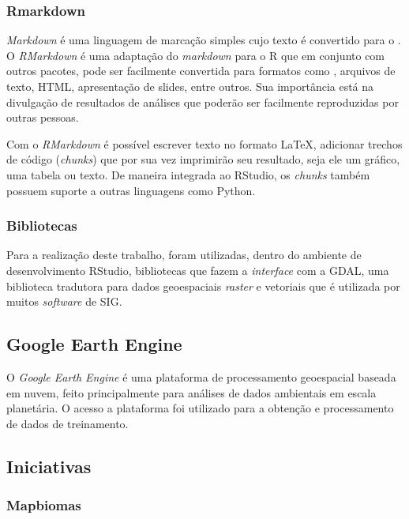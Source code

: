 \subsubsection{Rmarkdown}\label{rmarkdown}

\emph{Markdown} é uma linguagem de marcação simples cujo texto é
convertido para o . O
\emph{RMarkdown} é uma adaptação do \emph{markdown} para o R que em
conjunto com outros pacotes, pode ser facilmente convertida para
formatos como , arquivos de texto,
\acs{HTML}, apresentação de slides, entre outros. Sua importância está na
divulgação de resultados de análises que poderão ser facilmente
reproduzidas por outras pessoas.

Com o \emph{RMarkdown} é possível escrever texto no formato LaTeX,
adicionar trechos de código (\emph{chunks}) que por sua vez imprimirão
seu resultado, seja ele um gráfico, uma tabela ou texto. De maneira
integrada ao RStudio, os \emph{chunks} também possuem suporte a outras
linguagens como Python.

\subsubsection{Bibliotecas}\label{bibliotecas}

Para a realização deste trabalho, foram utilizadas, dentro do ambiente
de desenvolvimento RStudio, bibliotecas que fazem a \emph{interface}
com a \acs{GDAL}, uma biblioteca
tradutora para dados geoespaciais \emph{raster} e vetoriais que é
utilizada por muitos \emph{software} de \acs{SIG}.

\subsection{Google Earth Engine}\label{google-earth-engine}

O \emph{Google Earth Engine} é uma plataforma de processamento
geoespacial baseada em nuvem, feito principalmente para análises de
dados ambientais em escala planetária. O acesso a plataforma foi
utilizado para a obtenção e processamento de dados de treinamento. \cite{gorelick2017google}

\subsection{Iniciativas}\label{iniciativas}

\subsubsection{Mapbiomas}\label{mapbiomas}

